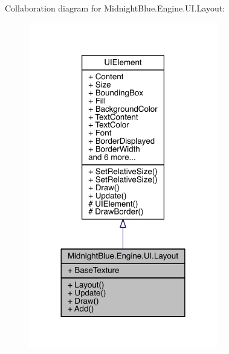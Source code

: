 Collaboration diagram for Midnight\+Blue.\+Engine.\+U\+I.\+Layout\+:
\nopagebreak
\begin{figure}[H]
\begin{center}
\leavevmode
\includegraphics[width=233pt]{class_midnight_blue_1_1_engine_1_1_u_i_1_1_layout__coll__graph}
\end{center}
\end{figure}
